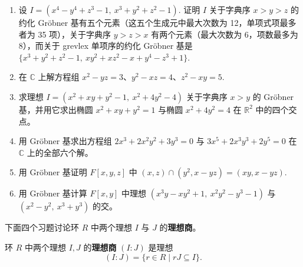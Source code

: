 \begin{enumerate}
\item 设 \(I = (x^4-y^4+z^3-1,\ x^3+y^2+z^2-1)\). 证明 \(I\) 关于字典序 \(x > y > z\) 的约化 Gröbner 基有五个元素（这五个生成元中最大次数为 12，单项式项最多者为 35 项），关于字典序 \(y > z > x\) 有两个元素（最大次数为 6，项数最多为 8），而关于 grevlex 单项序的约化 Gröbner 基是 \(\{x^3+y^2+z^2-1,\ xy^2+xz^2-x+y^4-z^3+1\}\).

\item 在 \(\mathbb{C}\) 上解方程组 \(x^2-yz = 3\)、\(y^2-xz = 4\)、\(z^2-xy = 5\).

\item 求理想 \(I = (x^2+xy+y^2-1,\ x^2+4y^2-4)\) 关于字典序 \(x > y\) 的 Gröbner 基，并用它求出椭圆 \(x^2+xy+y^2 = 1\) 与椭圆 \(x^2+4y^2 = 4\) 在 \(\mathbb{R}^2\) 中的四个交点。

\item 用 Gröbner 基求出方程组 \(2x^3+2x^2y^2+3y^3 = 0\) 与 \(3x^5+2x^3y^3+2y^5 = 0\) 在 \(\mathbb{C}\) 上的全部六个解。

\item 用 Gröbner 基证明 \(F[x, y, z]\) 中 \((x, z) \cap (y^2, x-yz) = (xy, x-yz)\).

\item 用 Gröbner 基计算 \(F[x, y]\) 中理想 \((x^3y-xy^2+1,\ x^2y^2-y^3-1)\) 与 \((x^2-y^2,\ x^3+y^3)\) 的交。
\end{enumerate}

\noindent 下面四个习题讨论环 \(R\) 中两个理想 \(I\) 与 \(J\) 的\textbf{理想商}。

\begin{definition}
环 \(R\) 中两个理想 \(I, J\) 的\textbf{理想商} \((I : J)\) 是理想
\[
(I : J) = \{r \in R \mid rJ \subseteq I\}.
\]
\end{definition}

